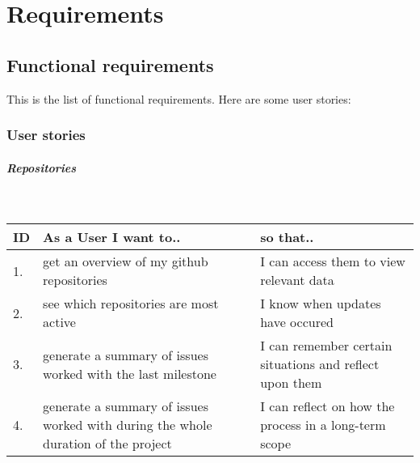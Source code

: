 \chapter{Requirements}
\label{chap:requirements}
\section{Functional requirements}
This is the list of functional requirements.
Here are some user stories:

\subsection{User stories}
\paragraph{Repositories}\mbox{}\\
\vspace{0.5cm}
 \begin{tabularx}{\linewidth}{| l | X | X |}
    \hline
    \rowcolor[gray]{0.8}
    \textbf{ID} & \textbf{As a User I want to..} & \textbf{so that..} \\
    \hline
    1. & get an overview of my github repositories & I can access them to view relevant data\\
    2. & see which repositories are most active  & I know when updates have occured\\
    3. & generate a summary of issues worked with the last milestone & I can remember certain situations and reflect upon them\\
    4. & generate a summary of issues worked with during the whole duration of the project & I can reflect on how the process in a long-term scope\\
    \hline
\end{tabularx}
\vspace{0.5cm}

